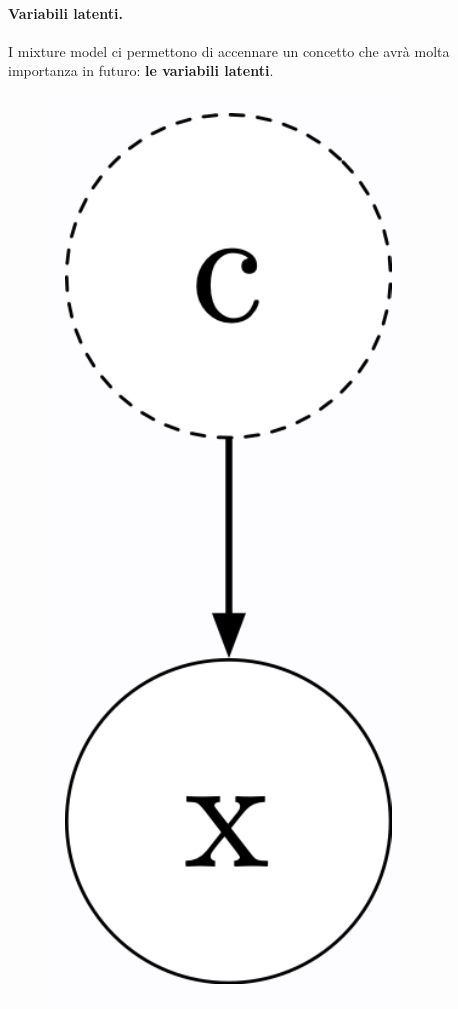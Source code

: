 \paragraph{Variabili latenti.}
I mixture model ci permettono di accennare un concetto che avrà molta importanza in futuro: \textbf{le variabili latenti}.
\begin{figure}[!h]
    \includegraphics[scale=.3]{images/prerequisites/varLat.png}
    \centering
\end{figure}



